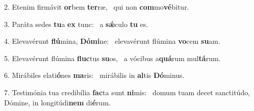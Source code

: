 2. Etenim firmávit \textbf{or}bem \textbf{ter}ræ, \ast\  qui non \textbf{com}mo\textbf{vé}bitur.\

3. Paráta sedes \textbf{tu}a \textbf{ex} tunc: \ast\  a \textbf{sǽ}culo \textbf{tu} es.\

4. Elevavérunt \textbf{flú}mina, \textbf{Dó}\textbf{mi}ne: \ast\  elevavérunt flúmina \textbf{vo}cem \textbf{su}am.\

5. Elevavérunt flúmina \textbf{fluc}tus \textbf{su}os, \ast\  a vócibus a\textbf{quá}rum mul\textbf{tá}rum.\

6. Mirábiles elati\textbf{ó}nes \textbf{ma}ris: \ast\  mirábilis in \textbf{al}tis \textbf{Dó}minus.\

7. Testimónia tua credibília \textbf{fac}ta sunt \textbf{ni}mis: \ast\  domum tuam decet sanctitúdo, Dómine, in longitúdi\textbf{nem} di\textbf{é}rum.\

